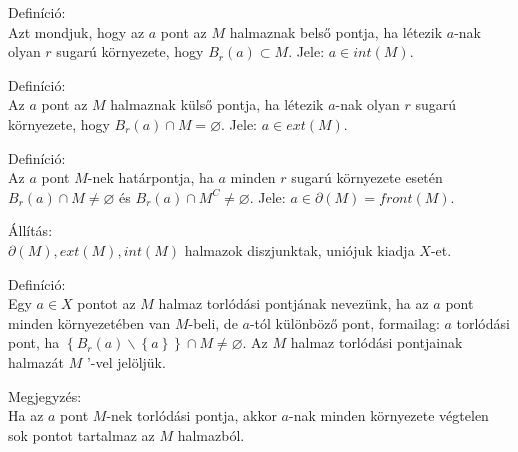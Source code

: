 \documentclass[12pt,a4paper]{scrartcl}
\newenvironment{definicio}{}{}
\newenvironment{allitas}{}{}
\newenvironment{megjegyzes}{}{}
\begin{document}
\begin{definicio}

Definíció:\\
Azt mondjuk, hogy az \(a\) pont az \(M\) halmaznak belső pontja, ha
létezik \(a\)-nak olyan \(r\) sugarú környezete, hogy
\(B_{r}\left( a \right) \subset M\). Jele:
\({a \in {int}\left( M \right)}.\)

\end{definicio}

\begin{definicio}

Definíció:\\
Az \(a\) pont az \(M\) halmaznak külső pontja, ha létezik \(a\)-nak
olyan \(r\) sugarú környezete, hogy
\(B_{r}\left( a \right) \cap M = \varnothing\). Jele:
\({a \in {ext}\left( M \right)}.\)

\end{definicio}

\begin{definicio}

Definíció:\\
Az \(a\) pont \(M\)-nek határpontja, ha \(a\) minden \(r\) sugarú
környezete esetén \(B_{r}\left( a \right) \cap M \neq \varnothing\) és
\(B_{r}\left( a \right) \cap M^{C} \neq \varnothing\). Jele:
\({a \in \partial\left( M \right) = {front}\left( M \right)}.\)

\end{definicio}

\begin{allitas}

Állítás:\\
\(\partial\left( M \right),{ext}\left( M \right),{int}\left( M \right)\)
halmazok diszjunktak, uniójuk kiadja \(X\)-et.

\end{allitas}

\begin{definicio}

Definíció:\\
Egy \(a \in X\) pontot az \(M\) halmaz torlódási pontjának nevezünk, ha
az \(a\) pont minden környezetében van \(M\)-beli, de \(a\)-tól
különböző pont, formailag: \(a\) torlódási pont, ha
\(\left\{ {B_{r}\left( a \right)\backslash\left\{ a \right\}} \right\} \cap M \neq \varnothing\).
Az \(M\) halmaz torlódási pontjainak halmazát \(M\) '-vel jelöljük.

\end{definicio}

\begin{megjegyzes}

Megjegyzés:\\
Ha az \(a\) pont \(M\)-nek torlódási pontja, akkor \(a\)-nak minden
környezete végtelen sok pontot tartalmaz az \(M\) halmazból.

\end{megjegyzes}
\end{document}
